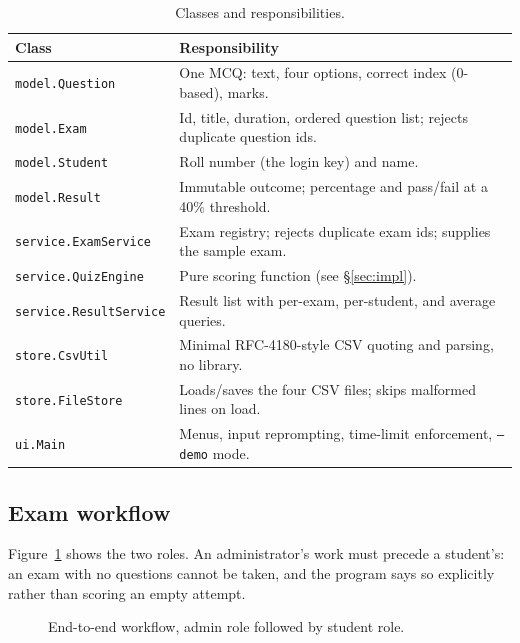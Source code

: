 \documentclass[11pt,a4paper]{article}
\begin{document}
\begin{table}[H]
\centering
\caption{Classes and responsibilities.}
\label{tab:modules}
\begin{tabular}{@{}p{3.6cm}p{9.6cm}@{}}
\toprule
\textbf{Class} & \textbf{Responsibility} \\
\midrule
\texttt{model.Question} & One MCQ: text, four options, correct index (0-based), marks. \\
\texttt{model.Exam} & Id, title, duration, ordered question list; rejects duplicate question ids. \\
\texttt{model.Student} & Roll number (the login key) and name. \\
\texttt{model.Result} & Immutable outcome; percentage and pass/fail at a 40\% threshold. \\
\texttt{service.ExamService} & Exam registry; rejects duplicate exam ids; supplies the sample exam. \\
\texttt{service.QuizEngine} & Pure scoring function (see \S\ref{sec:impl}). \\
\texttt{service.ResultService} & Result list with per-exam, per-student, and average queries. \\
\texttt{store.CsvUtil} & Minimal RFC-4180-style CSV quoting and parsing, no library. \\
\texttt{store.FileStore} & Loads/saves the four CSV files; skips malformed lines on load. \\
\texttt{ui.Main} & Menus, input reprompting, time-limit enforcement, \texttt{--demo} mode. \\
\bottomrule
\end{tabular}
\end{table}

\subsection{Exam workflow}
Figure~\ref{fig:flow} shows the two roles. An administrator's work must precede a
student's: an exam with no questions cannot be taken, and the program says so
explicitly rather than scoring an empty attempt.

\begin{figure}[H]
\centering
{}
\caption{End-to-end workflow, admin role followed by student role.}
\label{fig:flow}
\end{figure}
\end{document}
